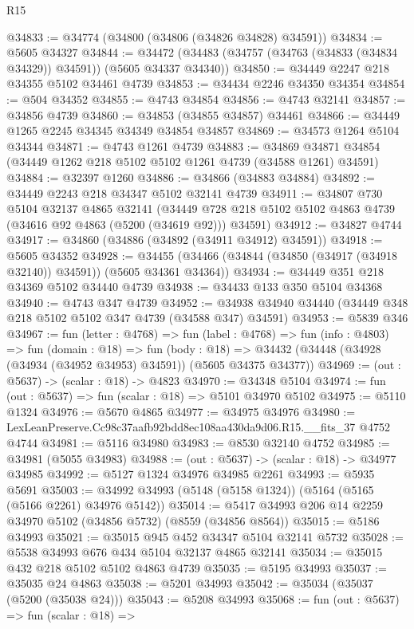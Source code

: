 \begin{lexlean}{R15}
\begin{coremodule}
{{{{{{{{{{{@34833 := @34774 (@34800 (@34806 (@34826 @34828) @34591))
@34834 := @5605 @34327
@34844 := @34472 (@34483 (@34757 (@34763 (@34833 (@34834 @34329)) @34591)) (@5605 @34337 @34340))
@34850 := @34449 @2247 @218 @34355 @5102 @34461 @4739
@34853 := @34434 @2246 @34350 @34354
@34854 := @504 @34352
@34855 := @4743 @34854
@34856 := @4743 @32141
@34857 := @34856 @4739
@34860 := @34853 (@34855 @34857) @34461
@34866 := @34449 @1265 @2245 @34345 @34349 @34854 @34857
@34869 := @34573 @1264 @5104 @34344
@34871 := @4743 @1261 @4739
@34883 := @34869 @34871 @34854 (@34449 @1262 @218 @5102 @5102 @1261 @4739 (@34588 @1261) @34591)
@34884 := @32397 @1260
@34886 := @34866 (@34883 @34884)
@34892 := @34449 @2243 @218 @34347 @5102 @32141 @4739
@34911 := @34807
    @730
    @5104
    @32137
    @4865
    @32141
    (@34449 @728 @218 @5102 @5102 @4863 @4739 (@34616 @92 @4863 (@5200 (@34619 @92))) @34591)
@34912 := @34827 @4744
@34917 := @34860 (@34886 (@34892 (@34911 @34912) @34591))
@34918 := @5605 @34352
@34928 := @34455 (@34466 (@34844 (@34850 (@34917 (@34918 @32140)) @34591)) (@5605 @34361 @34364))
@34934 := @34449 @351 @218 @34369 @5102 @34440 @4739
@34938 := @34433 @133 @350 @5104 @34368
@34940 := @4743 @347 @4739
@34952 := @34938 @34940 @34440 (@34449 @348 @218 @5102 @5102 @347 @4739 (@34588 @347) @34591)
@34953 := @5839 @346
@34967 := fun (letter : @4768) =>
  fun (label : @4768) =>
  fun (info : @4803) =>
  fun (domain : @18) =>
  fun (body : @18) => @34432 (@34448 (@34928 (@34934 (@34952 @34953) @34591)) (@5605 @34375 @34377))
@34969 := (out : @5637) -> (scalar : @18) -> @4823
@34970 := @34348 @5104
@34974 := fun (out : @5637) => fun (scalar : @18) => @5101 @34970 @5102
@34975 := @5110 @1324
@34976 := @5670 @4865
@34977 := @34975 @34976
@34980 := LexLeanPreserve.Cc98c37aafb92bdd8ec108aa430da9d06.R15.__fits_37 @4752 @4744
@34981 := @5116 @34980
@34983 := @8530 @32140 @4752
@34985 := @34981 (@5055 @34983)
@34988 := (out : @5637) -> (scalar : @18) -> @34977 @34985
@34992 := @5127 @1324 @34976 @34985 @2261
@34993 := @5935 @5691
@35003 := @34992 @34993 (@5148 (@5158 @1324)) (@5164 (@5165 (@5166 @2261) @34976 @5142))
@35014 := @5417 @34993 @206 @14 @2259 @34970 @5102 (@34856 @5732) (@8559 (@34856 @8564))
@35015 := @5186 @34993
@35021 := @35015 @945 @452 @34347 @5104 @32141 @5732
@35028 := @5538 @34993 @676 @434 @5104 @32137 @4865 @32141
@35034 := @35015 @432 @218 @5102 @5102 @4863 @4739
@35035 := @5195 @34993
@35037 := @35035 @24 @4863
@35038 := @5201 @34993
@35042 := @35034 (@35037 (@5200 (@35038 @24)))
@35043 := @5208 @34993
@35068 := fun (out : @5637) =>
  fun (scalar : @18) =>
}}}}}}}}}}}
\end{coremodule}
\end{lexlean}
